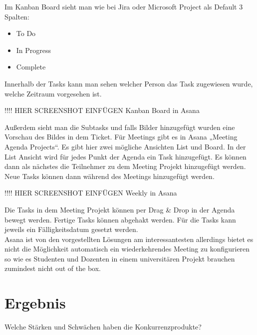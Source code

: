 Im Kanban Board sieht man wie bei Jira oder Microsoft Project als Default 3 Spalten:
\begin{itemize}
    \item To Do
    \item In Progress
    \item Complete
\end{itemize}

Innerhalb der Tasks kann man sehen welcher Person das Task zugewiesen wurde, welche Zeitraum vorgesehen ist.

!!!! HIER SCREENSHOT EINFÜGEN
Kanban Board in Asana

Außerdem sieht man die Subtasks und falls Bilder hinzugefügt wurden eine Vorschau des Bildes in dem Ticket. Für Meetings gibt es in Asana „Meeting Agenda Projects“. Es gibt hier zwei mögliche Ansichten List und Board. In der List Ansicht wird für jedes Punkt der Agenda ein Task hinzugefügt. Es können dann als nächstes die Teilnehmer zu dem Meeting Projekt hinzugefügt werden. Neue Tasks können dann während des Meetings hinzugefügt werden.

!!!! HIER SCREENSHOT EINFÜGEN
Weekly in Asana

Die Tasks in dem Meeting Projekt können per Drag \& Drop in der Agenda bewegt werden. Fertige Tasks können abgehakt werden. Für die Tasks kann jeweils ein Fälligkeitsdatum gesetzt werden.\\
Asana ist von den vorgestellten Lösungen am interessantesten allerdings bietet es nicht die Möglichkeit automatisch ein wiederkehrendes Meeting zu konfigurieren so wie es Studenten und Dozenten in einem universitären Projekt brauchen zumindest nicht out of the box.

\section{Ergebnis}

Welche Stärken und Schwächen haben die Konkurrenzprodukte?\\

